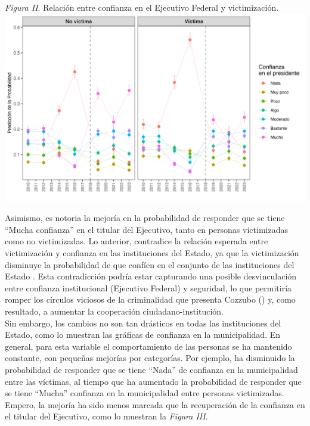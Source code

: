 \documentclass[letterpaper]{article}
\begin{document}
\vspace{-0.2cm}
\begin{center}
\emph{Figura II}. Relación entre confianza en el Ejecutivo Federal y victimización.
\includegraphics[width = 14cm]{plot_pres.png}
    \label{tab:Figura3}
\end{center}

Asimismo, es notoria la mejoría en la probabilidad de responder que se tiene ``Mucha confianza'' en el titular del Ejecutivo, tanto en personas victimizadas como no victimizadas. Lo anterior, contradice la relación esperada entre victimización y confianza en las instituciones del Estado, ya que la victimización disminuye la probabilidad de que confíen en el conjunto de las instituciones del Estado \autocite{blanco2012, blanco2013b, weyland2003}. Esta contradicción podría estar capturando una posible desvinculación entre confianza institucional (Ejecutivo Federal) y seguridad, lo que permitiría romper los círculos viciosos de la criminalidad que presenta Cozzubo (\citeyear{cozzubo2021}) y, como resultado, a aumentar la cooperación ciudadano-institución.\\[-1.5em]

Sin embargo, los cambios no son tan drásticos en todas las instituciones del Estado, como lo muestran las gráficas de confianza en la municipalidad. En general, para esta variable el comportamiento de las personas se ha mantenido constante, con pequeñas mejorías por categorías. Por ejemplo, ha disminuido la probabilidad de responder que se tiene ``Nada'' de confianza en la municipalidad entre las víctimas, al tiempo que ha aumentado la probabilidad de responder que se tiene ``Mucha'' confianza en la municipalidad entre personas victimizadas. Empero, la mejoría ha sido menos marcada que la recuperación de la confianza en el titular del Ejecutivo, como lo muestran la \emph{Figura III}.\\[-1.5em]
\end{document}
